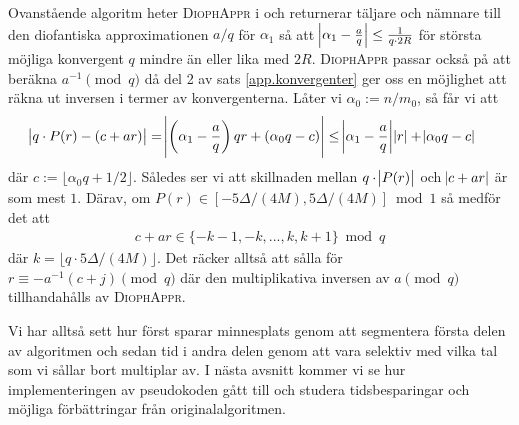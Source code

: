 Ovanstående algoritm heter \textsc{DiophAppr} i \cite{HaraldSieve} och returnerar täljare och nämnare till den diofantiska approximationen \(a/q\) för \(\alpha_1\) så att \(\abs{\alpha_1 - \frac{a}{q}} \leq \frac{1}{q \cdot 2R}\) för största möjliga konvergent $q$ mindre än eller lika med \(2R\). \textsc{DiophAppr} passar också på att beräkna \(a^{-1} \pmod{q}\) då del 2 av sats \ref{app.konvergenter} ger oss en möjlighet att räkna ut inversen i termer av konvergenterna. Låter vi \(\alpha_0 := n / m_0\), så får vi att 
\begin{align*}
    \abs{q \cdot P(r) - (c + ar)} &= \abs{\left(\alpha_1 - \frac{a}{q}\right) q r + \left( \alpha_0 q - c\right)} \leq 
    \abs{\alpha_1 - \frac{a}{q}} \abs{r} + \abs{\alpha_0 q - c} 
\end{align*}
där \(c := \lfloor \alpha_0 q + 1/2 \rfloor\). Således ser vi att skillnaden mellan \(q \cdot \abs{P(r)}\) och \(\abs{c + ar}\) är som mest \(1\). Därav, om \(P(r) \in [-5\Delta/(4M), 5\Delta/(4M)] \bmod 1\) så medför det att
\begin{align*}
    c + ar \in \{- k - 1, - k, ... , k, k + 1\} \bmod q
\end{align*}
där \(k = \lfloor q \cdot 5\Delta/(4M) \rfloor\). Det räcker alltså att sålla för \(r \equiv - a^{-1} (c + j) \pmod{q}\) där den multiplikativa inversen av $a \pmod{q}$ tillhandahålls av \textsc{DiophAppr}. %

Vi har alltså sett hur \cite{HaraldSieve} först sparar minnesplats genom att segmentera första delen av algoritmen och sedan tid i andra delen genom att vara selektiv med vilka tal som vi sållar bort multiplar av. I nästa avsnitt kommer vi se hur implementeringen av pseudokoden \cite{HaraldSieve} gått till och studera tidsbesparingar och möjliga förbättringar från originalalgoritmen.